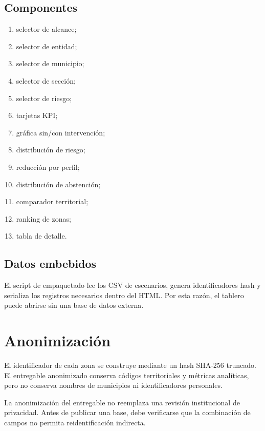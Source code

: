 \documentclass[11pt,a4paper]{article}
\begin{document}
\subsection{Componentes}

\begin{enumerate}
    \item selector de alcance;
    \item selector de entidad;
    \item selector de municipio;
    \item selector de sección;
    \item selector de riesgo;
    \item tarjetas KPI;
    \item gráfica sin/con intervención;
    \item distribución de riesgo;
    \item reducción por perfil;
    \item distribución de abstención;
    \item comparador territorial;
    \item ranking de zonas;
    \item tabla de detalle.
\end{enumerate}

\subsection{Datos embebidos}

El script de empaquetado lee los CSV de escenarios, genera identificadores hash y serializa los registros necesarios dentro del HTML. Por esta razón, el tablero puede abrirse sin una base de datos externa.

\section{Anonimización}

El identificador de cada zona se construye mediante un hash SHA-256 truncado. El entregable anonimizado conserva códigos territoriales y métricas analíticas, pero no conserva nombres de municipios ni identificadores personales.

\begin{warning}
La anonimización del entregable no reemplaza una revisión institucional de privacidad. Antes de publicar una base, debe verificarse que la combinación de campos no permita reidentificación indirecta.
\end{warning}
\end{document}
